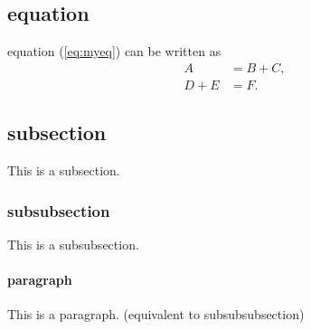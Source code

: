 
\subsection{equation}

equation (\ref{eq:myeq}) can be written as 
%
\begin{equation}
\label{eq:myeq}
\begin{split}
	A 		&= B + C, \\
    D + E	&= F.
\end{split}
\end{equation}

\subsection{subsection}
This is a subsection.

\subsubsection{subsubsection}
This is a subsubsection.

\paragraph{paragraph}
This is a paragraph. (equivalent to subsubsubsection)

\newpage